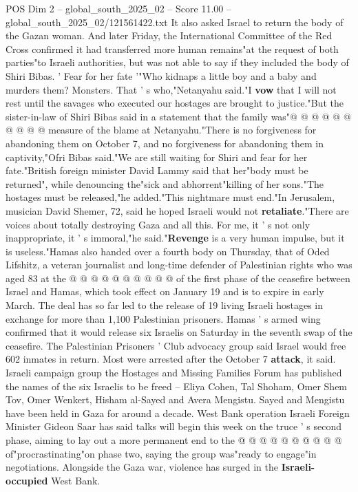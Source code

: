\begin{textsample}{POS Dim 2 – global\_south\_2025\_02 – Score 11.00 – global\_south\_2025\_02/121561422.txt}
It also asked Israel to return the body of the Gazan woman.
And later Friday, the International Committee of the Red Cross confirmed it had transferred more human remains"at the request of both parties"to Israeli authorities, but was not able to say if they included the body of Shiri Bibas. ' Fear for her fate '"Who kidnaps a little boy and a baby and murders them?
Monsters.
That ' s who,"Netanyahu said."I \textbf{vow} that I will not rest until the savages who executed our hostages are brought to justice."But the sister-in-law of Shiri Bibas said in a statement that the family was"@ @ @ @ @ @ @ @ @ @ measure of the blame at Netanyahu."There is no forgiveness for abandoning them on October 7, and no forgiveness for abandoning them in captivity,"Ofri Bibas said."We are still waiting for Shiri and fear for her fate."British foreign minister David Lammy said that her"body must be returned", while denouncing the"sick and abhorrent"killing of her sons."The hostages must be released,"he added."This nightmare must end."In Jerusalem, musician David Shemer, 72, said he hoped Israeli would not \textbf{retaliate}."There are voices about totally destroying Gaza and all this.
For me, it ' s not only inappropriate, it ' s immoral,"he said."\textbf{Revenge} is a very human impulse, but it is useless."Hamas also handed over a fourth body on Thursday, that of Oded Lifshitz, a veteran journalist and long-time defender of Palestinian rights who was aged 83 at the @ @ @ @ @ @ @ @ @ @ of the first phase of the ceasefire between Israel and Hamas, which took effect on January 19 and is to expire in early March.
The deal has so far led to the release of 19 living Israeli hostages in exchange for more than 1,100 Palestinian prisoners.
Hamas ' s armed wing confirmed that it would release six Israelis on Saturday in the seventh swap of the ceasefire.
The Palestinian Prisoners ' Club advocacy group said Israel would free 602 inmates in return.
Most were arrested after the October 7 \textbf{attack}, it said.
Israeli campaign group the Hostages and Missing Families Forum has published the names of the six Israelis to be freed -- Eliya Cohen, Tal Shoham, Omer Shem Tov, Omer Wenkert, Hisham al-Sayed and Avera Mengistu.
Sayed and Mengistu have been held in Gaza for around a decade.
West Bank operation Israeli Foreign Minister Gideon Saar has said talks will begin this week on the truce ' s second phase, aiming to lay out a more permanent end to the @ @ @ @ @ @ @ @ @ @ of"procrastinating"on phase two, saying the group was"ready to engage"in negotiations.
Alongside the Gaza war, violence has surged in the \textbf{Israeli-occupied} West Bank.

\end{textsample}
